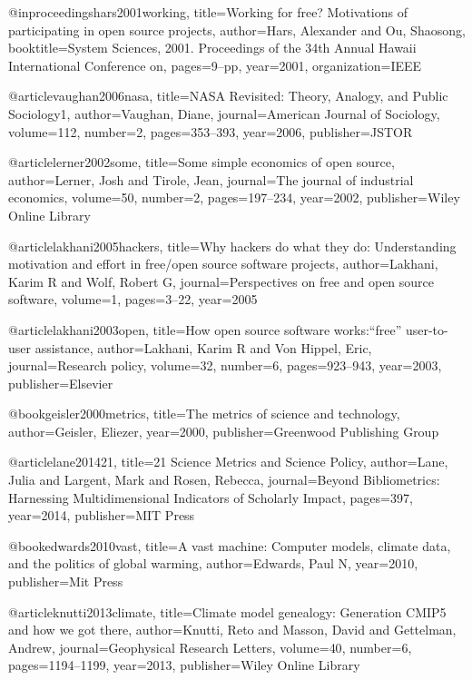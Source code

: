 @inproceedings{hars2001working,
  title={Working for free? Motivations of participating in open source projects},
  author={Hars, Alexander and Ou, Shaosong},
  booktitle={System Sciences, 2001. Proceedings of the 34th Annual Hawaii International Conference on},
  pages={9--pp},
  year={2001},
  organization={IEEE}
}

@article{vaughan2006nasa,
  title={NASA Revisited: Theory, Analogy, and Public Sociology1},
  author={Vaughan, Diane},
  journal={American Journal of Sociology},
  volume={112},
  number={2},
  pages={353--393},
  year={2006},
  publisher={JSTOR}
}


@article{lerner2002some,
  title={Some simple economics of open source},
  author={Lerner, Josh and Tirole, Jean},
  journal={The journal of industrial economics},
  volume={50},
  number={2},
  pages={197--234},
  year={2002},
  publisher={Wiley Online Library}
}

@article{lakhani2005hackers,
  title={Why hackers do what they do: Understanding motivation and effort in free/open source software projects},
  author={Lakhani, Karim R and Wolf, Robert G},
  journal={Perspectives on free and open source software},
  volume={1},
  pages={3--22},
  year={2005}
}

@article{lakhani2003open,
  title={How open source software works:“free” user-to-user assistance},
  author={Lakhani, Karim R and Von Hippel, Eric},
  journal={Research policy},
  volume={32},
  number={6},
  pages={923--943},
  year={2003},
  publisher={Elsevier}
}

@book{geisler2000metrics,
  title={The metrics of science and technology},
  author={Geisler, Eliezer},
  year={2000},
  publisher={Greenwood Publishing Group}
}

@article{lane201421,
  title={21 Science Metrics and Science Policy},
  author={Lane, Julia and Largent, Mark and Rosen, Rebecca},
  journal={Beyond Bibliometrics: Harnessing Multidimensional Indicators of Scholarly Impact},
  pages={397},
  year={2014},
  publisher={MIT Press}
}

@book{edwards2010vast,
  title={A vast machine: Computer models, climate data, and the politics of global warming},
  author={Edwards, Paul N},
  year={2010},
  publisher={Mit Press}
}

@article{knutti2013climate,
  title={Climate model genealogy: Generation CMIP5 and how we got there},
  author={Knutti, Reto and Masson, David and Gettelman, Andrew},
  journal={Geophysical Research Letters},
  volume={40},
  number={6},
  pages={1194--1199},
  year={2013},
  publisher={Wiley Online Library}
}

